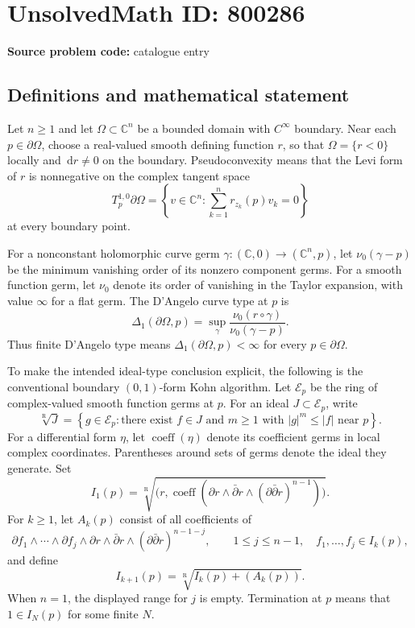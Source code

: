 \documentclass[11pt]{article}
\newcommand{\C}{\mathbb{C}}
\newcommand{\dd}{\,\mathrm{d}}
\begin{document}
\section*{UnsolvedMath ID: 800286}
\textbf{Source problem code:} catalogue entry
\subsection{Definitions and mathematical statement}
Let \(n\geq 1\) and let \(\Omega\subset\C^n\) be a bounded domain with \(C^\infty\) boundary. Near each \(p\in\partial\Omega\), choose a real-valued smooth defining function \(r\), so that \(\Omega=\{r<0\}\) locally and \(\dd r\neq0\) on the boundary. Pseudoconvexity means that the Levi form of \(r\) is nonnegative on the complex tangent space
\[
T^{1,0}_p\partial\Omega=\left\{v\in\C^n:\sum_{k=1}^n r_{z_k}(p)v_k=0\right\}
\]
at every boundary point.

For a nonconstant holomorphic curve germ \(\gamma:(\C,0)\to(\C^n,p)\), let \(\nu_0(\gamma-p)\) be the minimum vanishing order of its nonzero component germs. For a smooth function germ, let \(\nu_0\) denote its order of vanishing in the Taylor expansion, with value \(\infty\) for a flat germ. The D'Angelo curve type at \(p\) is
\[
\Delta_1(\partial\Omega,p)
=\sup_{\gamma}\frac{\nu_0(r\circ\gamma)}{\nu_0(\gamma-p)}.
\]
Thus finite D'Angelo type means \(\Delta_1(\partial\Omega,p)<\infty\) for every \(p\in\partial\Omega\).

To make the intended ideal-type conclusion explicit, the following is the conventional boundary \((0,1)\)-form Kohn algorithm. Let \(\mathcal E_p\) be the ring of complex-valued smooth function germs at \(p\). For an ideal \(J\subset\mathcal E_p\), write
\[
\sqrt[\mathrm R]{J}
=\left\{g\in\mathcal E_p:\text{there exist }f\in J\text{ and }m\geq1\text{ with }|g|^m\leq |f|\text{ near }p\right\}.
\]
For a differential form \(\eta\), let \(\operatorname{coeff}(\eta)\) denote its coefficient germs in local complex coordinates. Parentheses around sets of germs denote the ideal they generate. Set
\[
I_1(p)=\sqrt[\mathrm R]{\bigl(r,\operatorname{coeff}(\partial r\wedge\bar\partial r\wedge(\partial\bar\partial r)^{n-1})\bigr)}.
\]
For \(k\geq1\), let \(A_k(p)\) consist of all coefficients of
\[
\partial f_1\wedge\cdots\wedge\partial f_j\wedge\partial r\wedge\bar\partial r\wedge(\partial\bar\partial r)^{n-1-j},
\qquad 1\leq j\leq n-1,\quad f_1,\ldots,f_j\in I_k(p),
\]
and define
\[
I_{k+1}(p)=\sqrt[\mathrm R]{I_k(p)+(A_k(p))}.
\]
When \(n=1\), the displayed range for \(j\) is empty. Termination at \(p\) means that \(1\in I_N(p)\) for some finite \(N\).
\end{document}
